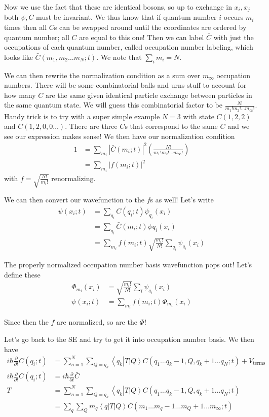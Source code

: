 \documentclass[10pt]{report}
\newcommand{\bra}[1]{\left<#1\right|}
\newcommand{\ket}[1]{\left|#1\right>}
\newcommand{\pd}[2]{\frac{\partial #1}{\partial#2}}
\newcommand{\abs}[1]{\left|#1\right|}
\begin{document}
Now we use the fact that these are identical bosons, so up to exchange in $x_i, x_j$ both $\psi, C$ must be invariant. We thus know that if quantum number $i$ occurs $m_i$ times then all $C$s can be swapped around until the coordinates are ordered by quantum number; all $C$ are equal to this one! Then we can label $\bar{C}$ with just the occupations of each quantum number, called occupation number labeling, which looks like $\bar{C}(m_1, m_2\dots m_N; t)$. We note that $\sum_{i}^{}m_i = N$. 

We can then rewrite the normalization condition as a sum over $m_\infty$ occupation numbers. There will be some combinatorial balls and urns stuff to account for how many $C$ are the same given identical particle exchange between particles in the same quantum state. We will guess this combinatorial factor to be $\frac{N!}{m_1!m_2!\dots m_\infty!}$. Handy trick is to try with a super simple example $N=3$ with state $C(1,2,2)$ and $\bar{C}(1,2,0,0\dots)$. There are three $C$s that correspond to the same $\bar{C}$ and we see our expression makes sense! We then have our normalization condition
\begin{align}
    1 &= \sum_{m_i}^{}\abs{\bar{C}(m_i; t)}^2\left( \frac{N!}{m_1!m_2!\dots m_\infty!} \right)\\
    &= \sum_{m_i}^{}\abs{f(m_i; t)}^2
\end{align}
with $f = \sqrt{\frac{N!}{m_i!}}$ renormalizing. 

We can then convert our wavefunction to the $f$s as well! Let's write
\begin{align}
    \psi(x_i; t) &= \sum_{q_i}C(q_i;t) \psi_{q_i}(x_i)\\
    &= \sum_{q_i}\bar{C}(m_i; t) \psi q_i(x_i)\\
    &= \sum_{m_i}f(m_i; t)\sqrt{\frac{m_i!}{N!}} \sum_{q_i}\psi_{q_i}(x_i)
\end{align}

The properly normalized occupation number basis wavefunction pops out! Let's define these
\begin{align}
    \Phi_{m_i}(x_i) &= \sqrt{\frac{m_i!}{N!}}\sum_{i}^{}\psi_{q_i}(x_i)\label{2.26.ONWF}\\
    \psi(x_i; t) &= \sum_{m_i}f(m_i; t) \Phi_{m_i}(x_i)
\end{align}

Since then the $f$ are normalized, so are the $\Phi$! 

Let's go back to the SE and try to get it into occupation number basis. We then have
\begin{align}
    i\hbar\pd{}{t}C(q_i; t) &= \sum_{n=1}^{N}\sum_{Q = q_k}\bra{q_{k}}T\ket{Q} C(q_1\dots q_{k}-1,Q, q_{k}+1\dots q_N;t) + V_{\text{terms}}\\
    i\hbar \pd{}{t}C(q_i; t) &= i\hbar \pd{}{t}\bar{C}\\
    T &= \sum_{n=1}^{N}\sum_{Q = q_k}\bra{q_{k}}T\ket{Q} C(q_1\dots q_{k}-1,Q, q_{k}+1\dots q_N;t)\\
    &= \sum_{q}^{}\sum_{Q}^{}m_q\bra{q}T\ket{Q}\bar{C}(m_1\dots m_{q}-1 \dots m_{Q}+1\dots m_\infty; t)
\end{align}
\end{document}
